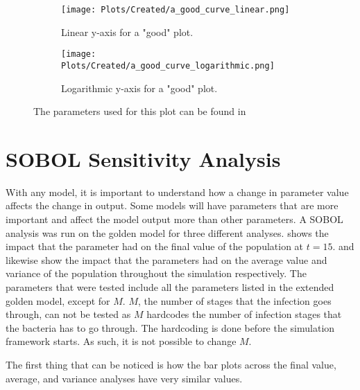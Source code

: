 \begin{figure}[h!]
    \centering
    \begin{subfigure}{1\linewidth}
        \centering
        \texttt{[image: Plots/Created/a\_good\_curve\_linear.png]}
        \caption{
            Linear y-axis for a "good" plot. 
        }
        \label{fig:created:a_good_curve_linear}
    \end{subfigure}
    \hfill
    \begin{subfigure}{1\linewidth}
        \centering
        \texttt{[image: Plots/Created/a\_good\_curve\_logarithmic.png]}
        \caption{
            Logarithmic y-axis for a "good" plot. 
        }
        \label{fig:created:a_good_curve_logarithmic}
    \end{subfigure}
    \label{fig:created:a_good_curve}
    \caption{The parameters used for this plot can be found in }
\end{figure}



\section{SOBOL Sensitivity Analysis}
With any model, it is important to understand how a change in parameter value affects the change in output. 
Some models will have parameters that are more important and affect the model output more than other parameters. 
A SOBOL analysis was run on the golden model for three different analyses. 
 shows the impact that the parameter had on the final value of the population at $t=15$. 
 and  likewise show the impact that the parameters had on the average value and variance of the population throughout the simulation respectively. 
The parameters that were tested include all the parameters listed in the extended golden model, except for $M$. 
$M$, the number of stages that the infection goes through, can not be tested as $M$ hardcodes the number of infection stages that the bacteria has to go through. 
The hardcoding is done before the simulation framework starts. As such, it is not possible to change $M$. 

The first thing that can be noticed is how the bar plots across the final value, average, and variance analyses have very similar values. 

